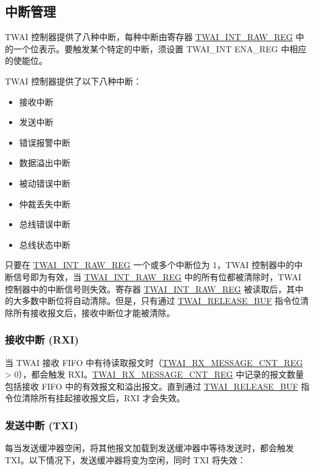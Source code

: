 \documentclass[main\_\_CN.tex]{subfiles}
\begin{document}
\subsection{中断管理}
\label{sec:twai-interrupt-management}
\chipname{} TWAI 控制器提供了八种中断，每种中断由寄存器 \hyperref[regdesc:TWAIINTRAWREG]{TWAI\_INT\_RAW\_REG} 中的一个位表示。要触发某个特定的中断，须设置 TWAI\_INT ENA\_REG 中相应的使能位。

TWAI 控制器提供了以下八种中断：

\begin{itemize}
    \item 接收中断
    \item 发送中断
    \item 错误报警中断
    \item 数据溢出中断
    \item 被动错误中断
    \item 仲裁丢失中断
    \item 总线错误中断
    \item 总线状态中断
\end{itemize}

只要在 \hyperref[regdesc:TWAIINTRAWREG]{TWAI\_INT\_RAW\_REG} 一个或多个中断位为 1，TWAI 控制器中的中断信号即为有效，当 \hyperref[regdesc:TWAIINTRAWREG]{TWAI\_INT\_RAW\_REG} 中的所有位都被清除时，TWAI 控制器中的中断信号则失效。寄存器 \hyperref[regdesc:TWAIINTRAWREG]{TWAI\_INT\_RAW\_REG} 被读取后，其中的大多数中断位将自动清除。但是，只有通过 \hyperref[fielddesc:TWAIRELEASEBUF]{TWAI\_RELEASE\_BUF} 指令位清除所有接收报文后，接收中断位才能被清除。

\subsubsection{接收中断 (RXI)}
当 TWAI 接收 FIFO 中有待读取报文时（\hyperref[regdesc:TWAIRXMESSAGECNTREG]{TWAI\_RX\_MESSAGE\_CNT\_REG} > 0），都会触发 RXI。\hyperref[regdesc:TWAIRXMESSAGECNTREG]{TWAI\_RX\_MESSAGE\_CNT\_REG} 中记录的报文数量包括接收 FIFO 中的有效报文和溢出报文。直到通过 \hyperref[fielddesc:TWAIRELEASEBUF]{TWAI\_RELEASE\_BUF} 指令位清除所有挂起接收报文后，RXI 才会失效。

\subsubsection{发送中断 (TXI)}
每当发送缓冲器空闲，将其他报文加载到发送缓冲器中等待发送时，都会触发 TXI。以下情况下，发送缓冲器将变为空闲，同时 TXI 将失效：
\end{document}
